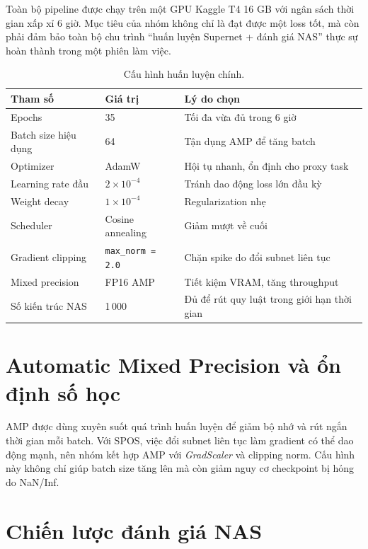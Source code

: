 Toàn bộ pipeline được chạy trên một GPU Kaggle T4 16 GB với ngân sách thời gian xấp xỉ 6 giờ. Mục tiêu của nhóm không chỉ là đạt được một loss tốt, mà còn phải đảm bảo toàn bộ chu trình ``huấn luyện Supernet + đánh giá NAS'' thực sự hoàn thành trong một phiên làm việc.

\begin{table}[H]
\centering
\caption{Cấu hình huấn luyện chính.}
\begin{tabular}{@{}p{}p{}p{}@{}}
\toprule
\textbf{Tham số} & \textbf{Giá trị} & \textbf{Lý do chọn} \\
\midrule
Epochs & 35 & Tối đa vừa đủ trong 6 giờ \\
Batch size hiệu dụng & 64 & Tận dụng AMP để tăng batch \\
Optimizer & AdamW & Hội tụ nhanh, ổn định cho proxy task \\
Learning rate đầu & \(2 \times 10^{-4}\) & Tránh dao động loss lớn đầu kỳ \\
Weight decay & \(1 \times 10^{-4}\) & Regularization nhẹ \\
Scheduler & Cosine annealing & Giảm mượt về cuối \\
Gradient clipping & \texttt{max\_norm = 2.0} & Chặn spike do đổi subnet liên tục \\
Mixed precision & FP16 AMP & Tiết kiệm VRAM, tăng throughput \\
Số kiến trúc NAS & 1\,000 & Đủ để rút quy luật trong giới hạn thời gian \\
\bottomrule
\end{tabular}
\end{table}

\section{Automatic Mixed Precision và ổn định số học}

AMP được dùng xuyên suốt quá trình huấn luyện để giảm bộ nhớ và rút ngắn thời gian mỗi batch. Với SPOS, việc đổi subnet liên tục làm gradient có thể dao động mạnh, nên nhóm kết hợp AMP với \textit{GradScaler} và clipping norm. Cấu hình này không chỉ giúp batch size tăng lên mà còn giảm nguy cơ checkpoint bị hỏng do NaN/Inf. \cite{micikevicius2018mixed}

\section{Chiến lược đánh giá NAS}

